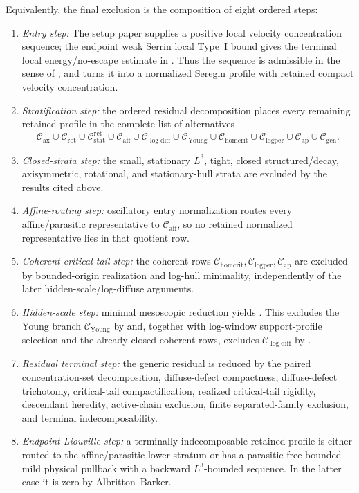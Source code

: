 \documentclass[11pt]{amsart}
\numberwithin{equation}{section}
\theoremstyle{plain}
\theoremstyle{definition}
\theoremstyle{remark}
\newcommand{\Cax}{\mathcal C_{\mathrm{ax}}}
\newcommand{\Crot}{\mathcal C_{\mathrm{rot}}}
\newcommand{\Cstat}{\mathcal C_{\mathrm{stat}}^{\mathrm{ret}}}
\newcommand{\Caff}{\mathcal C_{\mathrm{aff}}}
\newcommand{\Cgen}{\mathcal C_{\mathrm{gen}}}
\newcommand{\Chomcrit}{\mathcal C_{\mathrm{homcrit}}}
\newcommand{\Clogper}{\mathcal C_{\mathrm{logper}}}
\newcommand{\Capcrit}{\mathcal C_{\mathrm{ap}}}
\newcommand{\Cyoung}{\mathcal C_{\mathrm{Young}}}
\newcommand{\Clogdiff}{\mathcal C_{\log\mathrm{diff}}}
\begin{document}
Equivalently, the final exclusion is the composition of eight ordered steps:
\begin{enumerate}[label=\textup{(\arabic*)}]
   \item \emph{Entry step:} The setup paper supplies a positive local
   velocity concentration sequence; the endpoint weak Serrin local Type~I bound
    gives the terminal local
   energy/no-escape estimate in
   .  Thus the sequence is
   admissible in the sense of , and
    turns it into a normalized Seregin profile
   with retained compact velocity concentration.
   \item \emph{Stratification step:} the ordered residual decomposition
   places every remaining retained profile in the complete list of alternatives
   \[
      \Cax\cup\Crot\cup\Cstat\cup\Caff
      \cup\Clogdiff\cup\Cyoung\cup\Chomcrit\cup\Clogper\cup\Capcrit
      \cup\Cgen .
   \]
   \item \emph{Closed-strata step:} the small, stationary \(L^3\),
   tight, closed structured/decay, axisymmetric, rotational, and
   stationary-hull strata are excluded by the results cited above.
   \item \emph{Affine-routing step:} oscillatory entry normalization routes every
   affine/parasitic representative to \(\Caff\), so no retained normalized
   representative lies in that quotient row.
   \item \emph{Coherent critical-tail step:} the coherent rows
   \(\Chomcrit,\Clogper,\Capcrit\) are excluded by bounded-origin realization
   and log-hull minimality, independently of the later hidden-scale/log-diffuse
   arguments.
   \item \emph{Hidden-scale step:} minimal mesoscopic reduction yields
   .  This excludes the
   Young branch \(\Cyoung\) by  and, together
   with log-window support-profile selection and the already closed coherent
   rows, excludes \(\Clogdiff\) by .
   \item \emph{Residual terminal step:} the generic residual is reduced
   by the paired concentration-set decomposition, diffuse-defect compactness,
   diffuse-defect trichotomy, critical-tail compactification, realized
   critical-tail rigidity, descendant heredity, active-chain exclusion, finite
   separated-family exclusion, and terminal indecomposability.
   \item \emph{Endpoint Liouville step:} a terminally indecomposable
   retained profile is either routed to the affine/parasitic lower stratum
   or has a parasitic-free bounded mild physical pullback with a backward
   \(L^3\)-bounded sequence.  In the latter case it is zero by
   Albritton--Barker.
\end{enumerate}
\end{document}
